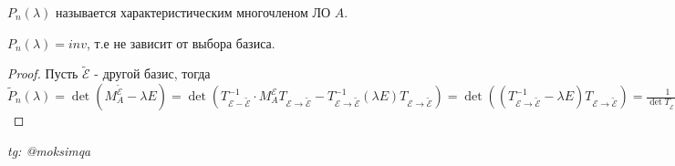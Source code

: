 \documentclass[../main.tex]{subfiles}
\begin{document}
\begin{definition}
    $P_{n}(\lambda)$ называется характеристическим многочленом ЛО $A$. 
\end{definition}
\begin{theorem}
    $P_{n}(\lambda)= inv$, т.е не зависит от выбора базиса. 
\end{theorem}
\begin{proof}
    Пусть $\tilde{\mathcal{E}}$ - другой базис, тогда $\tilde{P}_{n}(\lambda) = \det(M_{A}^{\tilde{\mathcal{E}}}-\lambda E)=\det{(T^{-1}_{\mathcal{E}-\tilde{\mathcal{E}}}\cdot M_{A}^{\mathcal{E}}T_{\mathcal{E}\to\tilde{\mathcal{E}}}- T^{-1}_{\mathcal{E}\to\tilde{\mathcal{E}}}(\lambda E)T_{\mathcal{E}\to\tilde{\mathcal{E}}})}=\det{((T^{-1}_{\mathcal{E}\to\tilde{\mathcal{E}}}-\lambda E)T_{\mathcal{E}\to\tilde{\mathcal{E}}})}= \frac{1}{\det{T_{\mathcal{E}\to\tilde{\mathcal{E}}}}}\cdot \det{(M_{A}^{\mathcal{E}}-\lambda E)\det{T_{\mathcal{E}\to \tilde{\mathcal{E}}}}}= det(M_{A}^{\mathcal{E}}-\lambda E)= P_{n}(\lambda)$
\end{proof}

\vspace{1cm}
\begin{flushright}
    \textit{tg: @moksimqa}
\end{flushright}
\end{document}
